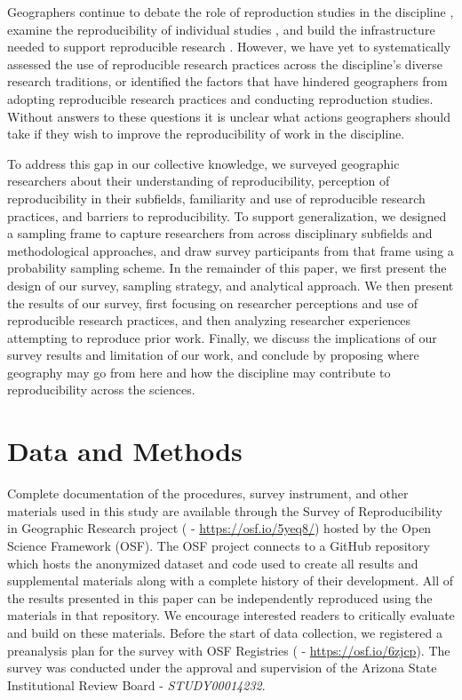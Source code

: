 \documentclass[]{interact}
\newcommand{\citep}{\parencite}
\theoremstyle{plain}%
\theoremstyle{definition}
\theoremstyle{remark}
\begin{document}
Geographers continue to debate the role of reproduction studies in the discipline \citep{brunsdon2016, goodchild2021Annals, kedron2022replication, kedron2021IJGIS, singleton2016, sui2021, Wainwright2021}, examine the reproducibility of individual studies \citep{Nust_AGILE_2022, ostermann2021}, and build the infrastructure needed to support reproducible research \citep{nust2019, wilson2021, yin2019cybergis, Kedron_Holler_Bardin_Hilgendorf_2022}. 
However, we have yet to systematically assessed the use of reproducible research practices across the discipline's diverse research traditions, or identified the factors that have hindered geographers from adopting reproducible research practices and conducting reproduction studies. 
Without answers to these questions it is unclear what actions geographers should take if they wish to improve the reproducibility of work in the discipline.

To address this gap in our collective knowledge, we surveyed geographic researchers about their understanding of reproducibility, perception of reproducibility in their subfields, familiarity and use of reproducible research practices, and barriers to reproducibility.
To support generalization, we designed a sampling frame to capture researchers from across disciplinary subfields and methodological approaches, and draw survey participants from that frame using a probability sampling scheme.
In the remainder of this paper, we first present the design of our survey, sampling strategy, and analytical approach. 
We then present the results of our survey, first focusing on researcher perceptions and use of reproducible research practices, and then analyzing researcher experiences attempting to reproduce prior work. 
Finally, we discuss the implications of our survey results and limitation of our work, and conclude by proposing where geography may go from here and how the discipline may contribute to reproducibility across the sciences. 


\section*{Data and Methods}
Complete documentation of the procedures, survey instrument, and other materials used in this study are available through the Survey of Reproducibility in Geographic Research project (\textcite{Kedron_Holler_Bardin_Hilgendorf_2022} - \url{https://osf.io/5yeq8/}) hosted by the Open Science Framework (OSF).
The OSF project connects to a GitHub repository which hosts the anonymized dataset and code used to create all results and supplemental materials along with a complete history of their development. 
All of the results presented in this paper can be independently reproduced using the materials in that repository.
We encourage interested readers to critically evaluate and build on these materials.
Before the start of data collection, we registered a preanalysis plan for the survey with OSF Registries (\textcite{Kedron_Survey_PAP} - \url{https://osf.io/6zjcp}). 
The survey was conducted under the approval and supervision of the Arizona State Institutional Review Board - \textit{STUDY00014232}.
\end{document}
